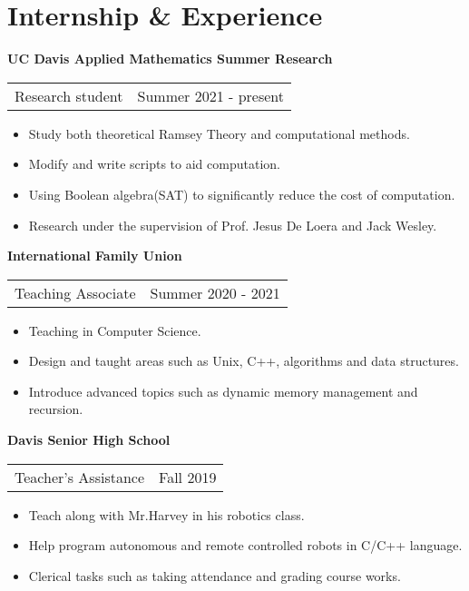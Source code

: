 \section{\sc Internship \& Experience}
{\bf{UC Davis Applied Mathematics Summer Research}}\\
\begin{tabular}{@{}p{4in}p{2in}}
Research student & Summer 2021 - present\\
\end{tabular}
\begin{itemize}
\setlength\itemsep{0em}
\item Study both theoretical Ramsey Theory and computational methods.
\item Modify and write scripts to aid computation.
\item Using Boolean algebra(SAT) to significantly reduce the cost of computation.
\item Research under the supervision of Prof. Jesus De Loera and Jack Wesley. 
\end{itemize}

{\bf{International Family Union}}\\
\begin{tabular}{@{}p{4in}p{2in}}
Teaching Associate & Summer 2020 - 2021\\
\end{tabular}
\begin{itemize}
\setlength\itemsep{0em}
\item Teaching in Computer Science.
\item Design and taught areas such as Unix, C++, algorithms and data structures.
\item Introduce advanced topics such as dynamic memory management and recursion.
\end{itemize}
{\bf{Davis Senior High School}}\\
\begin{tabular}{@{}p{4in}p{2in}}
Teacher's Assistance & Fall 2019\\
\end{tabular}
\begin{itemize}
\setlength\itemsep{0em}
\item Teach along with Mr.Harvey in his robotics class.
\item Help program autonomous and remote controlled robots in C/C++ language.
\item Clerical tasks such as taking attendance and grading course works. 
\end{itemize}
\endinput